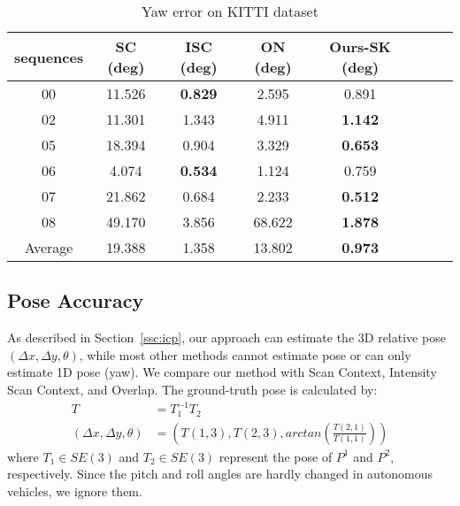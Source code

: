 \documentclass[letterpaper, 10 pt, conference]{ieeeconf}
\begin{document}
    \begin{table}[t]\footnotesize
        \caption{\centering Yaw error on KITTI dataset}\vspace{-3mm}
        \label{table:yaw}
        \begin{center}
        \begin{threeparttable}
            {
        \begin{tabular}{c c c c c c c c}
        \hline
        sequences & SC (deg) & ISC (deg) & ON (deg) & Ours-SK (deg) \\ 
        \hline
        00 & 11.526&\textbf{0.829}&2.595&0.891\\
        02 &11.301&1.343&4.911&\textbf{1.142}\\
        05 &18.394&0.904&3.329&\textbf{0.653}\\
        06 &4.074&\textbf{0.534}&1.124&0.759\\
        07 &21.862&0.684&2.233&\textbf{0.512}\\
        08 &49.170&3.856&68.622&\textbf{1.878}\\
        Average &19.388&1.358&13.802&\textbf{0.973}\\
        \hline
        \end{tabular}
        }
\end{threeparttable}
        \end{center}
        \end{table}
     
\subsection{Pose Accuracy}
As described in Section~\ref{ssc:icp}, our approach can estimate the 3D relative pose \( (\Delta x, \Delta y, \theta)\), while most other methods cannot estimate pose or can only estimate 1D pose (yaw). We compare our method with Scan Context, Intensity Scan Context, and Overlap. The ground-truth pose is calculated by:
\begin{equation}
    \begin{aligned}
    T&=T_1^{-1}T_2\\
    (\Delta x,\Delta y,\theta)&=(T(1,3),T(2,3),arctan(\frac{T(2,1)}{T(1,1)}))
    \end{aligned}
\end{equation}
where \(T_1\in SE(3)\) and \(T_2\in SE(3)\) represent the pose of \(P^1\) and \(P^2\), respectively. Since the pitch and roll angles are hardly changed in autonomous vehicles, we ignore them.
\end{document}
